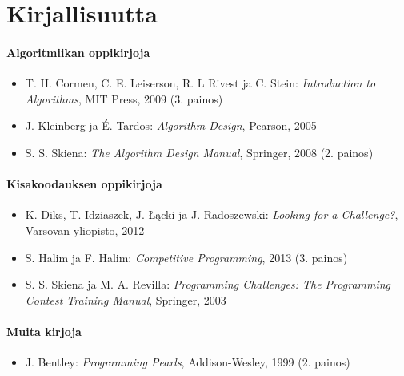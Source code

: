 \chapter*{Kirjallisuutta}

\subsubsection{Algoritmiikan oppikirjoja}

\begin{itemize}
\item T. H. Cormen, C. E. Leiserson,
R. L Rivest ja C. Stein:
\emph{Introduction to Algorithms},
MIT Press, 2009 (3. painos)
\item J. Kleinberg ja É. Tardos:
\emph{Algorithm Design},
Pearson, 2005
\item S. S. Skiena:
\emph{The Algorithm Design Manual},
Springer, 2008 (2. painos)
\end{itemize}

\subsubsection{Kisakoodauksen oppikirjoja}

\begin{itemize}
\item K. Diks, T. Idziaszek,
J. Łącki ja J. Radoszewski:
\emph{Looking for a Challenge?},
Varsovan yliopisto, 2012
\item S. Halim ja F. Halim:
\emph{Competitive Programming},
2013 (3. painos)
\item S. S. Skiena ja M. A. Revilla:
\emph{Programming Challenges: The Programming
Contest Training Manual},
Springer, 2003
\end{itemize}

\subsubsection{Muita kirjoja}

\begin{itemize}
\item J. Bentley:
\emph{Programming Pearls},
Addison-Wesley, 1999 (2. painos)
\end{itemize}